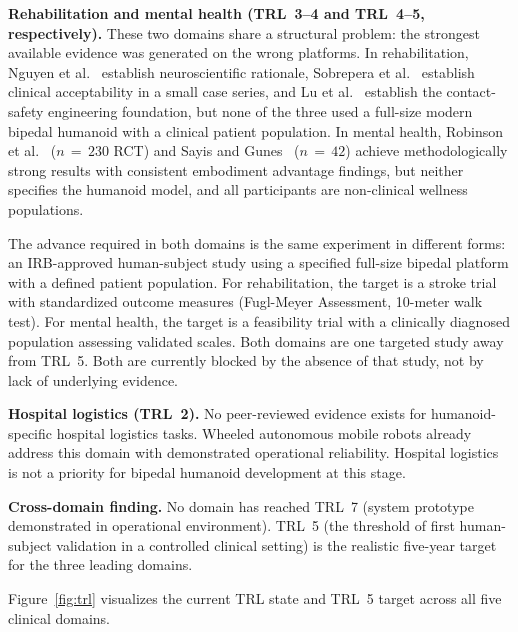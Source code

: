 \documentclass[acmsmall]{acmart}
\begin{document}
\textbf{Rehabilitation and mental health (TRL~3--4 and TRL~4--5, respectively).}
These two domains share a structural problem: the strongest available evidence
was generated on the wrong platforms. In rehabilitation, Nguyen et
al.~\cite{nguyen2024eeg} establish neuroscientific rationale, Sobrepera et
al.~\cite{sobrepera2022feasibility} establish clinical acceptability in a small
case series, and Lu et al.~\cite{lu2025gentlehumanoid} establish the
contact-safety engineering foundation, but none of the three used a full-size
modern bipedal humanoid with a clinical patient population. In mental health,
Robinson et al.~\cite{robinson2023brief} ($n\,=\,230$ RCT) and Sayis and
Gunes~\cite{sayis2024technology} ($n\,=\,42$) achieve methodologically strong
results with consistent embodiment advantage findings, but neither specifies the
humanoid model, and all participants are non-clinical wellness populations.

The advance required in both domains is the same experiment in different forms:
an IRB-approved human-subject study using a specified full-size bipedal platform
with a defined patient population. For rehabilitation, the target is a stroke
trial with standardized outcome measures (Fugl-Meyer Assessment,
10-meter walk test). For mental health, the target is a feasibility trial with a
clinically diagnosed population assessing validated scales. Both domains are one
targeted study away from TRL~5. Both are currently blocked by the absence of
that study, not by lack of underlying evidence.

\textbf{Hospital logistics (TRL~2).} No peer-reviewed evidence exists for
humanoid-specific hospital logistics tasks. Wheeled autonomous mobile robots
already address this domain with demonstrated operational reliability. Hospital
logistics is not a priority for bipedal humanoid development at this stage.

\textbf{Cross-domain finding.} No domain has reached TRL~7 (system prototype
demonstrated in operational environment). TRL~5 (the threshold of first
human-subject validation in a controlled clinical setting) is the realistic
five-year target for the three leading domains.

Figure~\ref{fig:trl} visualizes the current TRL state and TRL~5 target across
all five clinical domains.
\end{document}
